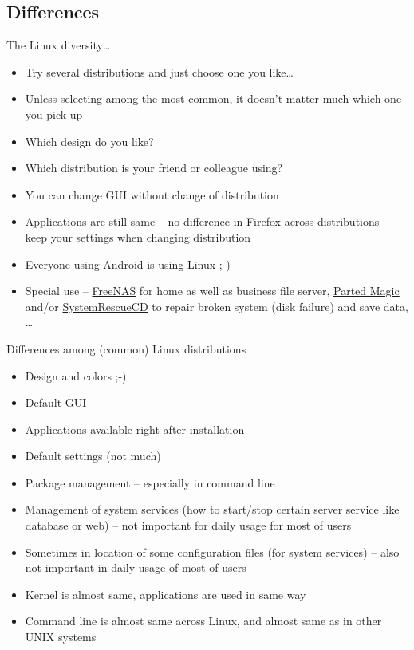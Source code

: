 \documentclass[compress, ucs, xelatex, 11pt, xcolor=svgnames,
  hyperref={
    bookmarks=true,
    unicode=true,
    colorlinks=true,
    pdftitle={Linux, command line and MetaCentrum},
    plainpages=false,
    pdfauthor={Vojtech Zeisek},
    pdfsubject={Course about use of Linux command line, writing shell scripts and using MetaCentrum of CESNET},
    pdfcreator={XeLaTeX},
    pdfkeywords={Linux, GNU, BASH, shell, command line, MetaCentrum},
    linkcolor=Red,
    anchorcolor=Blue,
    citecolor=Purple,
    filecolor=DodgerBlue,
    menucolor=DarkOrchid,
    urlcolor=DeepSkyBlue,
    pdftex},
  url={hyphens, lowtilde} %
  ]{beamer}
\begin{document}
\subsection{Differences}

\begin{frame}{The Linux diversity\ldots}
\begin{itemize}
  \item Try several distributions and just choose one you like\ldots
  \item Unless selecting among the most common, it doesn't matter much which one you pick up
  \item Which design do you like?
  \item Which distribution is your friend or colleague using?
  \item You can change GUI without change of distribution
  \item Applications are still same -- no difference in Firefox across distributions -- keep your settings when changing distribution
  \item Everyone using Android is using Linux ;-)
  \item Special use -- \href{http://www.freenas.org/}{FreeNAS} for home as well as business file server, \href{https://partedmagic.com/}{Parted Magic} and/or \href{https://www.system-rescue-cd.org/SystemRescueCd_Homepage}{SystemRescueCD} to repair broken system (disk failure) and save data, \ldots
\end{itemize}
\end{frame}

\begin{frame}{Differences among (common) Linux distributions}
\begin{itemize}
  \item Design and colors ;-)
  \item Default GUI
  \item Applications available right after installation
  \item Default settings (not much)
  \item Package management -- especially in command line
  \item Management of system services (how to start/stop certain server service like database or web) -- not important for daily usage for most of users
  \item Sometimes in location of some configuration files (for system services) -- also not important in daily usage of most of users
  \item Kernel is almost same, applications are used in same way
  \item Command line is almost same across Linux, and almost same as in other UNIX systems
\end{itemize}
\end{frame}
\end{document}
